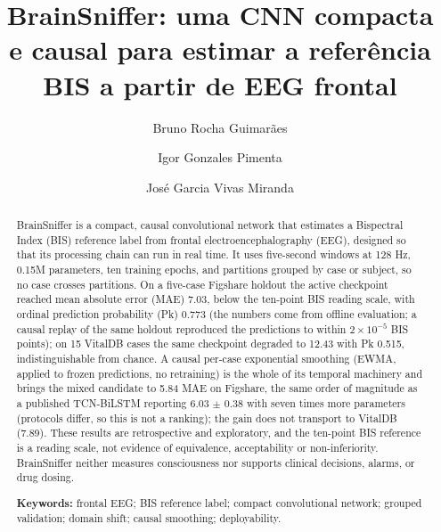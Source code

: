 \documentclass[12pt]{article}
\title{BrainSniffer: uma CNN compacta e causal para estimar a referência BIS a partir de EEG frontal}
\author{Bruno Rocha Guimarães\inst{1}\and Igor Gonzales Pimenta\inst{1}\and José Garcia Vivas Miranda\inst{1}}
\begin{document}
\maketitle

\begin{abstract}
BrainSniffer is a compact, causal convolutional network that estimates a Bispectral Index (BIS) reference label from frontal electroencephalography (EEG), designed so that its processing chain can run in real time. It uses five-second windows at 128 Hz, 0.15M parameters, ten training epochs, and partitions grouped by case or subject, so no case crosses partitions. On a five-case Figshare holdout the active checkpoint reached mean absolute error (MAE) 7.03, below the ten-point BIS reading scale, with ordinal prediction probability (Pk) 0.773 (the numbers come from offline evaluation; a causal replay of the same holdout reproduced the predictions to within $2\times10^{-5}$ BIS points); on 15 VitalDB cases the same checkpoint degraded to 12.43 with Pk 0.515, indistinguishable from chance. A causal per-case exponential smoothing (EWMA, applied to frozen predictions, no retraining) is the whole of its temporal machinery and brings the mixed candidate to 5.84 MAE on Figshare, the same order of magnitude as a published TCN-BiLSTM reporting 6.03 $\pm$ 0.38 with seven times more parameters (protocols differ, so this is not a ranking); the gain does not transport to VitalDB (7.89). These results are retrospective and exploratory, and the ten-point BIS reference is a reading scale, not evidence of equivalence, acceptability or non-inferiority. BrainSniffer neither measures consciousness nor supports clinical decisions, alarms, or drug dosing.

\textbf{Keywords:} frontal EEG; BIS reference label; compact convolutional network; grouped validation; domain shift; causal smoothing; deployability.
\end{abstract}
\end{document}

